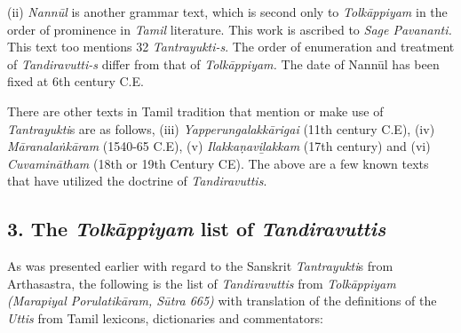 \newpage

(ii) \textit{Nannūl} is another grammar text, which is second only to \textit{Tolkāppiyam} in the order of prominence in \textit{Tamil} literature. This work is ascribed to \textit{Sage Pavananti.} This text too mentions 32 \textit{Tantrayukti-s}. The order of enumeration and treatment of \textit{Tandiravutti-s } differ from that of \textit{Tolkāppiyam.} The date of Nannūl has been fixed at 6th century C.E.

There are other texts in Tamil tradition that mention or make use of \textit{Tantrayukti}s are as follows, (iii) \textit{Yapperungalakkārigai} (11th century C.E), (iv) \textit{Māranalaṅkāram} (1540-65 C.E), (v) \textit{Ilakkaṇaviḻakkam} (17th century) and (vi) \textit{Cuvaminātham} (18th or 19th Century CE). The above are a few known texts that have utilized the doctrine of \textit{Tandiravuttis}.


\subsection*{3. The \textit{Tolkāppiyam} list of \textit{Tandiravuttis}}

As was presented earlier with regard to the Sanskrit \textit{Tantrayukti}s from Arthasastra, the following is the list of \textit{Tandiravuttis} from \textit{Tolkāppiyam (Marapiyal Porulatikāram, Sūtra 665)} with translation of the definitions of the \textit{Uttis} from Tamil lexicons, dictionaries and commentators:

